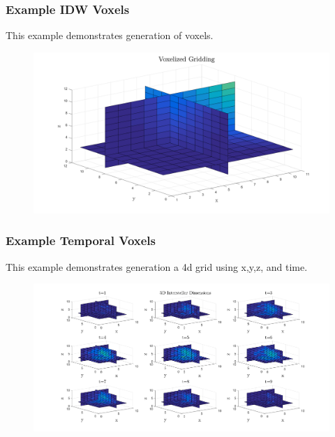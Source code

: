 \documentclass{article}
\begin{document}
\subsubsection*{Example IDW Voxels}
This example demonstrates generation of voxels.


\begin{figure}[H]
	\centering
	\includegraphics[width = \linewidth]{3d}
\end{figure}
\clearpage

\subsubsection*{Example Temporal Voxels}
This example demonstrates generation a 4d grid using x,y,z, and time.


\begin{figure}[H]
	\centering
	\includegraphics[width = \linewidth]{4d}
\end{figure}
\clearpage
\end{document}

